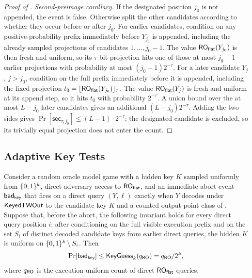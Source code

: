 \begin{proof}[Proof of ]
\emph{Second-preimage corollary.} If the designated position $j_0$ is
not appended, the event is false. Otherwise split the other candidates
according to whether they occur before or after $j_0$. For earlier
candidates, condition on any positive-probability prefix immediately
before $Y_{j_0}$ is appended, including the already sampled projections
of candidates $1,\dots,j_0-1$. The value $\mathsf{RO}_{\mathsf{flat}}(Y_{j_0})$ is then
fresh and uniform, so its $\tau$-bit projection hits one of those at most
$j_0-1$ earlier projections with probability at most
$(j_0-1)2^{-\tau}$. For a later candidate $Y_j$, $j>j_0$, condition on
the full prefix immediately before it is appended, including the fixed
projection $t_0 = \lfloor\mathsf{RO}_{\mathsf{flat}}(Y_{j_0})\rfloor_\tau$. The value
$\mathsf{RO}_{\mathsf{flat}}(Y_j)$ is fresh and uniform at its append step, so it hits
$t_0$ with probability $2^{-\tau}$. A union bound over the at most
$L-j_0$ later candidates gives an additional $(L-j_0)2^{-\tau}$.
Adding the two sides gives
$\Pr[\mathsf{sec}_{\tau,j_0}] \leq (L-1) \cdot 2^{-\tau}$; the
designated candidate is excluded, so its trivially equal projection does
not enter the count.
\end{proof}

\subsection{Adaptive Key Tests}
\label{app:lem-key-tests}

\begin{lemma}
\label{lem:key-tests}
Consider a \TW{} random oracle model game with a hidden key $K$ sampled
uniformly from $\{0,1\}^k$, direct adversary access to
$\mathsf{RO}_{\mathsf{flat}}$, and an immediate abort event $\mathsf{bad}_{\mathsf{key}}$ that fires on a
direct query $(Y,\ell)$ exactly when $Y$ decodes under $\mathsf{KeyedTWOut}$ to
the candidate key $K$ and a counted
output-point class of . Suppose that, before the
abort, the following invariant holds for every direct query position
$i$: after conditioning on the full visible execution prefix and on
the set $S_i$ of distinct decoded candidate keys from earlier direct
queries, the hidden $K$ is uniform on $\{0,1\}^k \setminus S_i$. Then
\[
  \Pr[\mathsf{bad}_{\mathsf{key}}]
  \leq \mathsf{KeyGuess}_k(q_{\mathsf{RO}})
  = q_{\mathsf{RO}} / 2^k,
\]
where $q_{\mathsf{RO}}$ is the execution-uniform count of direct $\mathsf{RO}_{\mathsf{flat}}$ queries.
\end{lemma}

